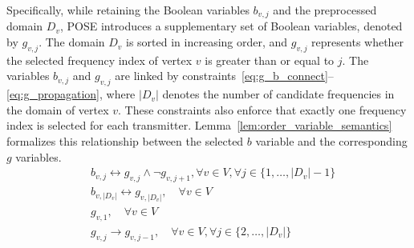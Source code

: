 Specifically, while retaining the Boolean variables $b_{v,j}$ and the preprocessed domain $D_v$, POSE introduces a supplementary set of Boolean variables, denoted by $g_{v,j}$.
The domain $D_v$ is sorted in increasing order, and $g_{v,j}$ represents whether the selected frequency index of vertex $v$ is greater than or equal to $j$.
The variables $b_{v,j}$ and $g_{v,j}$ are linked by constraints~\eqref{eq:g_b_connect}--\eqref{eq:g_propagation}, where $|D_v|$ denotes the number of candidate frequencies in the domain of vertex $v$.
These constraints also enforce that exactly one frequency index is selected for each transmitter.
Lemma~\ref{lem:order_variable_semantics} formalizes this relationship between the selected $b$ variable and the corresponding $g$ variables.
\begin{align}
    & b_{v,j} \leftrightarrow g_{v,j} \wedge \neg g_{v,j+1}, \forall v \in V, \forall j \in \{1, \dots, |D_v|-1\} \label{eq:g_b_connect} \\
    & b_{v,|D_v|} \leftrightarrow g_{v,|D_v|}, \quad \forall v \in V \label{eq:g_right_bound} \\
    & g_{v,1}, \quad \forall v \in V \label{eq:g_left_bound} \\
    & g_{v,j} \rightarrow g_{v,j-1}, \quad \forall v \in V, \forall j \in \{2, \dots, |D_v|\} \label{eq:g_propagation}
\end{align}

